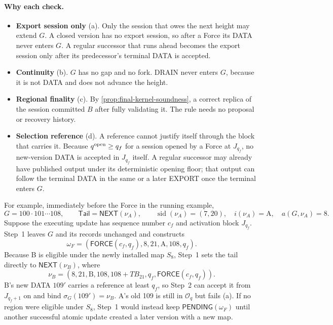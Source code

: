\documentclass[11pt,a4paper]{article}
\newcommand{\TB}{\mathit{TB}}
\newcommand{\tagg}[1]{\ensuremath{\mathsf{#1}}}
\begin{document}
\paragraph{Why each check.}
\begin{itemize}[itemsep=2pt]
\item \textbf{Export session only} (a). Only the session that owes the
next height may extend $G$. A closed version has no export session, so
after a Force its DATA never enters $G$. A regular successor that runs
ahead becomes the export session only after its predecessor's terminal
DATA is accepted.
\item \textbf{Continuity} (b). $G$ has no gap and no fork. DRAIN never
enters $G$, because it is not DATA and does not advance the height.
\item \textbf{Regional finality} (c). By
\cref{prop:final-kernel-soundness}, a correct replica of the session
committed $B$ after fully validating it. The rule needs no proposal or
recovery history.
\item \textbf{Selection reference} (d). A reference cannot justify itself
through the block that carries it. Because $q^{\rm open}\ge q_f$ for a
session opened by a Force at $J_{q_f}$, no new-version DATA is accepted
in $J_{q_f}$ itself.  A regular successor may already have published
output under its deterministic opening floor; that output can follow the
terminal DATA in the same or a later EXPORT once the terminal enters
$G$.
\end{itemize}


For example, immediately before the Force in the running example,
\[
 G=100\cdot101\cdots108,\qquad
 \mathsf{Tail}=\tagg{NEXT}(\nu_A),\qquad
 \operatorname{sid}(\nu_A)=(7,20),\quad i(\nu_A)=\text{A},\quad
 a(G,\nu_A)=8.
\]
Suppose the executing update has sequence number $c_f$ and activation
block $J_{q_f}$. Step~1 leaves $G$ and its records unchanged and
constructs
\[
 \omega_F=(\tagg{FORCE}(c_f,q_f),8,21,\text{A},108,q_f).
\]
Because B is eligible under the newly installed map $S_8$, Step~1 sets
the tail directly to $\tagg{NEXT}(\nu_B)$, where
\[
 \nu_B=(8,21,\text{B},108,108+\TB_{21},q_f,
        \tagg{FORCE}(c_f,q_f)).
\]
B's new DATA $109'$ carries a reference at least $q_f$, so Step~2 can
accept it from $J_{q_f+1}$ on and bind
$\sigma_G(109')=\nu_B$. A's old 109 is still in $\mathcal O_q$ but
fails (a). If no region were eligible under $S_8$, Step~1 would instead
keep $\tagg{PENDING}(\omega_F)$ until another successful atomic update
created a later version with a new map.
\end{document}
